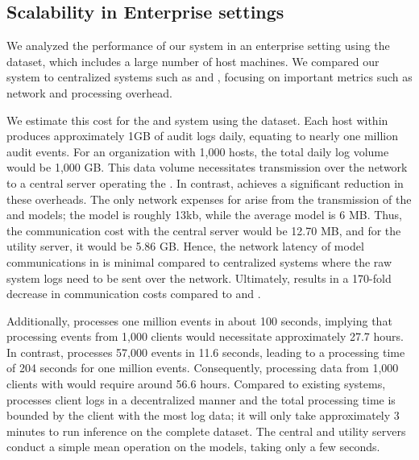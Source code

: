 
\subsection{Scalability in Enterprise settings}
\label{cost_metric}
We analyzed the performance of our system in an enterprise setting using the \optc dataset, which includes a large number of host machines. We compared our system to centralized systems such as \flash and \kairos, focusing on important metrics such as network and processing overhead.

 We estimate this cost for the \flash and \kairos system using the \optc dataset. Each host within \optc produces approximately 1GB of audit logs daily, equating to nearly one million audit events. For an organization with 1,000 hosts, the total daily log volume would be 1,000 GB. This data volume necessitates transmission over the network to a central server operating the \pids. In contrast, \Sys achieves a significant reduction in these overheads. The only network expenses for \Sys arise from the transmission of the \gnnshort and \wordvec models; the \gnnshort model is roughly 13kb, while the average \wordvec model is 6 MB. Thus, the communication cost with the central server would be 12.70 MB, and for the utility server, it would be 5.86 GB. Hence, the network latency of model communications in \Sys is minimal compared to centralized systems where the raw system logs need to be sent over the network. Ultimately, \Sys results in a 170-fold decrease in communication costs compared to \flash and \kairos.

 Additionally, \flash processes one million events in about 100 seconds, implying that processing events from 1,000 clients would necessitate approximately 27.7 hours. In contrast, \kairos processes 57,000 events in 11.6 seconds, leading to a processing time of 204 seconds for one million events. Consequently, processing data from 1,000 clients with \kairos would require around 56.6 hours. Compared to existing systems, \Sys processes client logs in a decentralized manner and the total processing time is bounded by the client with the most log data; it will only take approximately 3 minutes to run inference on the complete \optc dataset. The central and utility servers conduct a simple mean operation on the models, taking only a few seconds.

